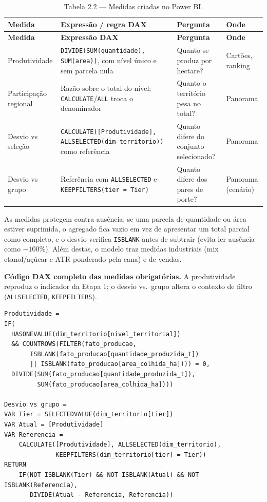 \documentclass[11pt,a4paper]{article}
\begin{document}
\begin{longtable}{L{3.2cm} L{6.8cm} L{2.4cm} L{2.0cm}}
\caption{Tabela 2.2 — Medidas criadas no Power BI.}\\
\toprule
\textbf{Medida} & \textbf{Expressão / regra DAX} & \textbf{Pergunta} & \textbf{Onde}\\
\midrule
\endfirsthead
\toprule
\textbf{Medida} & \textbf{Expressão DAX} & \textbf{Pergunta} & \textbf{Onde}\\
\midrule
\endhead
\bottomrule
\endfoot
Produtividade & \texttt{DIVIDE(SUM(quantidade), SUM(area))}, com nível único e sem parcela nula & Quanto se produz por hectare? & Cartões, ranking\\
\addlinespace
Participação regional & Razão sobre o total do nível; \texttt{CALCULATE}/\texttt{ALL} troca o denominador & Quanto o território pesa no total? & Panorama\\
\addlinespace
Desvio vs seleção & \texttt{CALCULATE([Produtividade], ALLSELECTED(dim\_territorio))} como referência & Quanto difere do conjunto selecionado? & Panorama\\
\addlinespace
Desvio vs grupo & Referência com \texttt{ALLSELECTED} e \texttt{KEEPFILTERS(tier = Tier)} & Quanto difere dos pares de porte? & Panorama (cenário)\\
\end{longtable}

As medidas protegem contra ausência: se uma parcela de quantidade ou área estiver suprimida, o
agregado fica vazio em vez de apresentar um total parcial como completo, e o desvio verifica
\texttt{ISBLANK} antes de subtrair (evita ler ausência como $-100\%$). Além destas, o modelo traz
medidas industriais (mix etanol/açúcar e ATR ponderado pela cana) e de vendas.

\textbf{Código DAX completo das medidas obrigatórias.} A produtividade reproduz o indicador da
Etapa 1; o desvio vs.\ grupo altera o contexto de filtro (\texttt{ALLSELECTED}, \texttt{KEEPFILTERS}).

{\footnotesize
\begin{verbatim}
Produtividade =
IF(
  HASONEVALUE(dim_territorio[nivel_territorial])
  && COUNTROWS(FILTER(fato_producao,
       ISBLANK(fato_producao[quantidade_produzida_t])
       || ISBLANK(fato_producao[area_colhida_ha]))) = 0,
  DIVIDE(SUM(fato_producao[quantidade_produzida_t]),
         SUM(fato_producao[area_colhida_ha])))

Desvio vs grupo =
VAR Tier = SELECTEDVALUE(dim_territorio[tier])
VAR Atual = [Produtividade]
VAR Referencia =
    CALCULATE([Produtividade], ALLSELECTED(dim_territorio),
              KEEPFILTERS(dim_territorio[tier] = Tier))
RETURN
    IF(NOT ISBLANK(Tier) && NOT ISBLANK(Atual) && NOT ISBLANK(Referencia),
       DIVIDE(Atual - Referencia, Referencia))
\end{verbatim}
}
\end{document}
